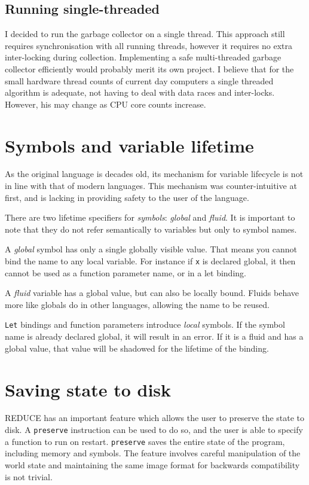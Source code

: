\subsection{Running single-threaded}

I decided to run the garbage collector on a single thread. This approach still requires synchronisation with all running
threads, however it requires no extra inter-locking during collection. Implementing a safe multi-threaded garbage collector
efficiently would probably merit its own project. I believe that for the small hardware thread counts of current day computers
a single threaded algorithm is adequate, not having to deal with data races and inter-locks. However, his may change as
CPU core counts increase.

\section{Symbols and variable lifetime}
As the original language is decades old, its mechanism for variable lifecycle is not in line with that of modern languages.
This mechanism was counter-intuitive at first, and is lacking in providing safety to the user of the language.

There are two lifetime specifiers for \emph{symbols}: \emph{global} and \emph{fluid}. It is important to note that they
do not refer semantically to variables but only to symbol names.

A \emph{global} symbol has only a single globally visible value. That means you cannot bind the name to any local
variable. For instance if \texttt{x} is declared global, it then cannot be used as a function parameter name, or in a
let binding.

A \emph{fluid} variable has a global value, but can also be locally bound. Fluids behave more like globals do
in other languages, allowing the name to be reused.

\texttt{Let} bindings and function parameters introduce \emph{local} symbols. If the symbol name is already declared global,
it will result in an error. If it is a fluid and has a global value, that value will be shadowed for the lifetime
of the binding.

\section{Saving state to disk}
REDUCE has an important feature which allows the user to preserve the state to disk. A \texttt{preserve} instruction can be
used to do so, and the user is able to specify a function to run on restart. \verb|preserve| saves the entire state of the
program, including memory and symbols. The feature involves careful manipulation of the world state and
maintaining the same image format for backwards compatibility is not trivial.

